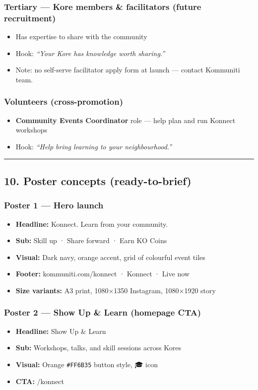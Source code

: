 \documentclass[11pt,a4paper]{report}
\begin{document}
\subsubsection{Tertiary --- Kore members \& facilitators (future recruitment)}
\begin{itemize}
  \item Has expertise to share with the community
  \item Hook: \textit{“Your Kore has knowledge worth sharing.”}
  \item Note: no self-serve facilitator apply form at launch --- contact Kommuniti team.
\end{itemize}

\subsubsection{Volunteers (cross-promotion)}
\begin{itemize}
  \item \textbf{Community Events Coordinator} role --- help plan and run Konnect workshops
  \item Hook: \textit{“Help bring learning to your neighbourhood.”}
\end{itemize}

\medskip\hrule\medskip

\subsection{10. Poster concepts (ready-to-brief)}

\subsubsection{Poster 1 --- Hero launch}
\begin{itemize}
  \item \textbf{Headline:} Konnect. Learn from your community.
  \item \textbf{Sub:} Skill up · Share forward · Earn KO Coins
  \item \textbf{Visual:} Dark navy, orange accent, grid of colourful event tiles
  \item \textbf{Footer:} kommuniti.com/konnect · Konnect · Live now
  \item \textbf{Size variants:} A3 print, 1080×1350 Instagram, 1080×1920 story
\end{itemize}

\subsubsection{Poster 2 --- Show Up \& Learn (homepage CTA)}
\begin{itemize}
  \item \textbf{Headline:} Show Up \& Learn
  \item \textbf{Sub:} Workshops, talks, and skill sessions across Kores
  \item \textbf{Visual:} Orange \texttt{\#FF6B35} button style, 🎓 icon
  \item \textbf{CTA:} /konnect
\end{itemize}
\end{document}
